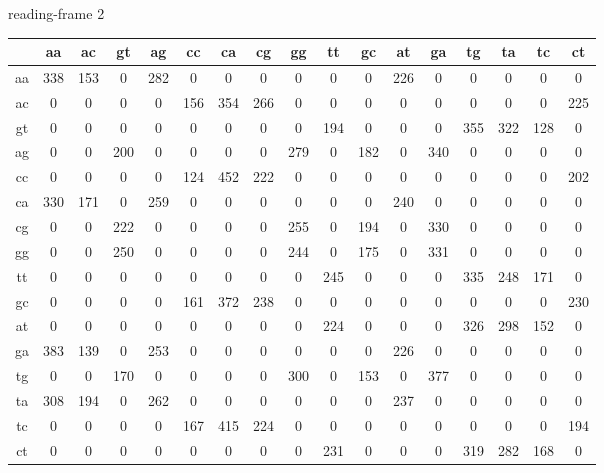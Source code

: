 \documentclass{homework}
\begin{document}
\begin{enumerate}
\begin{enumerate}
\normalsize
reading-frame 2
\tiny

\begin{tabular}{c|cccccccccccccccc}
   & aa & ac & gt & ag & cc & ca & cg & gg & tt & gc & at & ga & tg & ta & tc & ct\\\hline
aa & 338 & 153 &   0 & 282 &   0 &   0 &   0 &   0 &   0 &   0 & 226 &   0 &   0 &   0 &   0 &   0\\
ac &   0 &   0 &   0 &   0 & 156 & 354 & 266 &   0 &   0 &   0 &   0 &   0 &   0 &   0 &   0 & 225\\
gt &   0 &   0 &   0 &   0 &   0 &   0 &   0 &   0 & 194 &   0 &   0 &   0 & 355 & 322 & 128 &   0\\
ag &   0 &   0 & 200 &   0 &   0 &   0 &   0 & 279 &   0 & 182 &   0 & 340 &   0 &   0 &   0 &   0\\
cc &   0 &   0 &   0 &   0 & 124 & 452 & 222 &   0 &   0 &   0 &   0 &   0 &   0 &   0 &   0 & 202\\
ca & 330 & 171 &   0 & 259 &   0 &   0 &   0 &   0 &   0 &   0 & 240 &   0 &   0 &   0 &   0 &   0\\
cg &   0 &   0 & 222 &   0 &   0 &   0 &   0 & 255 &   0 & 194 &   0 & 330 &   0 &   0 &   0 &   0\\
gg &   0 &   0 & 250 &   0 &   0 &   0 &   0 & 244 &   0 & 175 &   0 & 331 &   0 &   0 &   0 &   0\\
tt &   0 &   0 &   0 &   0 &   0 &   0 &   0 &   0 & 245 &   0 &   0 &   0 & 335 & 248 & 171 &   0\\
gc &   0 &   0 &   0 &   0 & 161 & 372 & 238 &   0 &   0 &   0 &   0 &   0 &   0 &   0 &   0 & 230\\
at &   0 &   0 &   0 &   0 &   0 &   0 &   0 &   0 & 224 &   0 &   0 &   0 & 326 & 298 & 152 &   0\\
ga & 383 & 139 &   0 & 253 &   0 &   0 &   0 &   0 &   0 &   0 & 226 &   0 &   0 &   0 &   0 &   0\\
tg &   0 &   0 & 170 &   0 &   0 &   0 &   0 & 300 &   0 & 153 &   0 & 377 &   0 &   0 &   0 &   0\\
ta & 308 & 194 &   0 & 262 &   0 &   0 &   0 &   0 &   0 &   0 & 237 &   0 &   0 &   0 &   0 &   0\\
tc &   0 &   0 &   0 &   0 & 167 & 415 & 224 &   0 &   0 &   0 &   0 &   0 &   0 &   0 &   0 & 194\\
ct &   0 &   0 &   0 &   0 &   0 &   0 &   0 &   0 & 231 &   0 &   0 &   0 & 319 & 282 & 168 &   0\\
\end{tabular}


\end{enumerate}
\end{enumerate}
\end{document}
